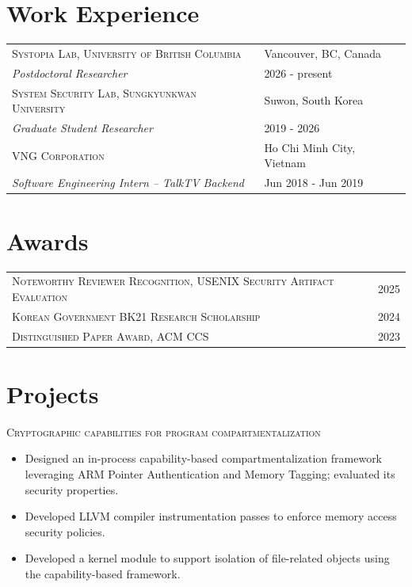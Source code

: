 \documentclass[a4paper,11pt]{article}
\begin{document}
\section{Work Experience}
\begin{tabularx}{\linewidth}{@{}lX@{}}
	\textsc{Systopia Lab, University of British Columbia} & \hfill Vancouver, BC, Canada     \\
	\emph{Postdoctoral Researcher}                        & \hfill  2026 - present           \\[6pt]
	\textsc{System Security Lab, Sungkyunkwan University} & \hfill Suwon, South Korea        \\
	\emph{Graduate Student Researcher}                    & \hfill  2019 - 2026              \\[6pt]
	\textsc{VNG Corporation}                              & \hfill Ho Chi Minh City, Vietnam \\
	\emph{Software Engineering Intern -- TalkTV Backend}  & \hfill  Jun 2018 - Jun 2019      \\
\end{tabularx}

\section{Awards}
\begin{tabularx}{\linewidth}{@{}lX@{}}
	\textsc{Noteworthy Reviewer Recognition, USENIX Security Artifact Evaluation} & \hfill 2025 \\[4pt]
	\textsc{Korean Government BK21 Research Scholarship}                          & \hfill 2024 \\[4pt]
	\textsc{Distinguished Paper Award, ACM CCS}                                   & \hfill 2023 \\
\end{tabularx}

\section{Projects}

\textsc{Cryptographic capabilities for program compartmentalization}~\cite{capacity}
\begin{itemize}[nosep,after=\strut, leftmargin=2em, itemsep=3pt]
	\item Designed an in-process capability-based compartmentalization framework leveraging ARM Pointer Authentication and Memory Tagging; evaluated its security properties.
	\item Developed LLVM compiler instrumentation passes to enforce memory access security policies.
	\item Developed a kernel module to support isolation of file-related objects using the capability-based framework.
\end{itemize}\vspace{6pt}
\end{document}
